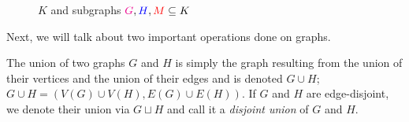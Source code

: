 \begin{figure}[H]
\begin{center}
    \end{center}
    \caption{$K$ and subgraphs $\textcolor{magenta}{G}, \textcolor{blue}{H}, \textcolor{red}{M} \subseteq K$}
    \label{fig:subgraphs}
    \end{figure}
Next, we will talk about two important operations done on graphs.

\begin{definition}
The union of two graphs $G$ and $H$ is simply the graph resulting from the union of their vertices and the union of their edges and is denoted $G\cup H$; $G\cup H=(V(G)\cup V(H),E(G)\cup E(H))$. If $G$ and $H$ are edge-disjoint, we denote their union via $G\sqcup H$ and call it a \textit{disjoint union} of $G$ and $H$.
\end{definition}

